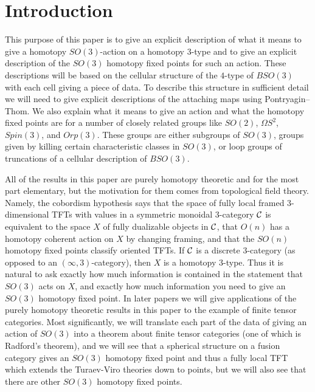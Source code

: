 \documentclass{amsart}
\begin{document}
 


\section{Introduction}

This purpose of this paper is to give an explicit description of what it means to give a homotopy $SO(3)$-action on a homotopy 3-type and to give an explicit description of the $SO(3)$ homotopy fixed points for such an action.  These descriptions will be based on the cellular structure of the $4$-type of $BSO(3)$ with each cell giving a piece of data.  To describe this structure in sufficient detail we will need to give explicit descriptions of the attaching maps using Pontryagin--Thom.  We also explain what it means to give an action and what the homotopy fixed points are for a number of closely related groups like $SO(2)$, $\Omega S^2$, $Spin(3)$, and $Orp(3)$.  These groups are either subgroups of $SO(3)$, groups given by killing certain characteristic classes in $SO(3)$, or loop groups of truncations of a cellular description of $BSO(3)$.

All of the results in this paper are purely homotopy theoretic and for the most part elementary, but the motivation for them comes from topological field theory.  Namely, the cobordism hypothesis says that the space of fully local framed $3$-dimensional TFTs with values in a symmetric monoidal $3$-category $\mathcal C$ is equivalent to the space $X$ of fully dualizable objects in $\mathcal C$, that $O(n)$ has a homotopy coherent action on $X$ by changing framing, and that the $SO(n)$ homotopy fixed points classify oriented TFTs.  If $\mathcal C$ is a discrete $3$-category (as opposed to an $(\infty,3)$-category), then $X$ is a homotopy $3$-type.  Thus it is natural to ask exactly how much information is contained in the statement that $SO(3)$ acts on $X$, and exactly how much information you need to give an $SO(3)$ homotopy fixed point.  In later papers we will give applications of the purely homotopy theoretic results in this paper to the example of finite tensor categories.  Most significantly, we will translate each part of the data of giving an action of $SO(3)$ into a theorem about finite tensor categories (one of which is Radford's theorem), and we will see that a spherical structure on a fusion category gives an $SO(3)$ homotopy fixed point and thus a fully local TFT which extends the Turaev-Viro theories down to points, but we will also see that there are other $SO(3)$ homotopy fixed points.
\end{document}
